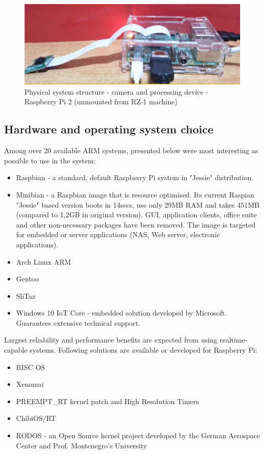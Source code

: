 \documentclass[12pt,twoside,a4paper]{article}
\begin{document}
\begin{figure}[H]
\centering
\includegraphics[width=0.8\paperwidth]{phisical}
\caption{Physical system structure - camera and processing device - Raspberry Pi 2 (unmounted from RZ-1 machine)}
\end{figure}


\subsection{Hardware and operating system choice}

Among over 20 available ARM systems, presented below were most interesting as possible to use in the system:
\begin{itemize}
  \item Raspbian - a standard, default Raspberry Pi system in "Jessie" distribution.
  \item Minibian - a Raspbian image that is resource optimised.
  Its current Raspian "Jessie" based version boots in 14secs, use only 29MB RAM and takes 451MB (compared to 1,2GB in original version). GUI, application clients, office suite and other non-necessary packages have been removed. The image is targeted for embedded or server applications (NAS, Web server, electronic applications).
  \item Arch Linux ARM
  \item Gentoo
  \item SliTaz
  \item Windows 10 IoT Core - embedded solution developed by Microsoft. Guarantees extensive technical support.
\end{itemize}

Largest reliability and performance benefits are expected from using realtime-capable systems.
Following solutions are available or developed for Raspberry Pi:

\begin{itemize}
  \item RISC OS
  \item Xenomai
  \item PREEMPT\_RT kernel patch and High Resolution Timers\cite{stackos}
  \item ChibiOS/RT\cite{chibi}
  \item RODOS - an Open Source kernel project developed by the German Aerospace Center and Prof. Montenegro's University\cite{rodos}
\end{itemize}
\end{document}
